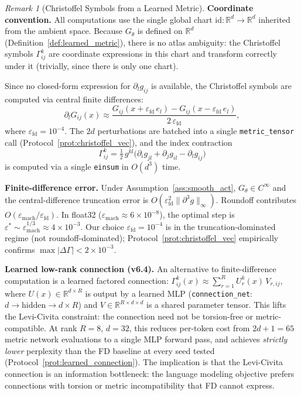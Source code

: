 \documentclass[11pt,a4paper]{article}
\theoremstyle{definition}
\theoremstyle{remark}
\newtheorem{remark}[theorem]{Remark}
\newcommand{\R}{\mathbb{R}}
\begin{document}
\begin{remark}[Christoffel Symbols from a Learned Metric]%
\label{rem:christoffel_learned}
\textbf{Coordinate convention.} All computations use the single 
global chart $\mathrm{id} : \R^d \to \R^d$ inherited from 
the ambient space. Because $G_\theta$ is defined on $\R^d$ 
(Definition~\ref{def:learned_metric}), there is no atlas 
ambiguity: the Christoffel symbols $\Gamma^k_{ij}$ are 
coordinate expressions in this chart and transform correctly 
under it (trivially, since there is only one chart).

Since no closed-form expression for $\partial_l g_{ij}$ is 
available, the Christoffel symbols are computed via central 
finite differences:
\begin{equation}\label{eq:christoffel_fd}
    \partial_l G_{ij}(x) \approx 
    \frac{G_{ij}(x + \varepsilon_{\mathrm{fd}}\, e_l) - 
          G_{ij}(x - \varepsilon_{\mathrm{fd}}\, e_l)}
    {2\,\varepsilon_{\mathrm{fd}}},
\end{equation}
where $\varepsilon_{\mathrm{fd}} = 10^{-4}$. The $2d$ 
perturbations are batched into a single \texttt{metric\_tensor} 
call (Protocol~\ref{prot:christoffel_vec}), and the index 
contraction
\begin{equation}\label{eq:christoffel_einsum}
    \Gamma^k_{ij} = \tfrac{1}{2}\, g^{kl}\!
    \bigl(\partial_i g_{jl} + \partial_j g_{il} 
    - \partial_l g_{ij}\bigr)
\end{equation}
is computed via a single \texttt{einsum} in $O(d^3)$ time.

\textbf{Finite-difference error.}
Under Assumption~\ref{ass:smooth_act}, $G_\theta \in C^\infty$ 
and the central-difference truncation error is 
$O(\varepsilon_{\mathrm{fd}}^2 \|\partial^3 g\|_\infty)$. 
Roundoff contributes $O(\varepsilon_{\mathrm{mach}} / 
\varepsilon_{\mathrm{fd}})$. In float32 
($\varepsilon_{\mathrm{mach}} \approx 6 \times 10^{-8}$), 
the optimal step is 
$\varepsilon^* \sim \varepsilon_{\mathrm{mach}}^{1/3} 
\approx 4 \times 10^{-3}$. Our choice 
$\varepsilon_{\mathrm{fd}} = 10^{-4}$ is in the 
truncation-dominated regime (not roundoff-dominated); 
Protocol~\ref{prot:christoffel_vec} empirically confirms 
$\max|\Delta\Gamma| < 2 \times 10^{-3}$.

\textbf{Learned low-rank connection (v6.4).}
An alternative to finite-difference computation is a learned 
factored connection: $\Gamma^k_{ij}(x) \approx \sum_{r=1}^{R} 
U^k_r(x)\, V_{r,ij}$, where $U(x) \in \R^{d \times R}$ is 
output by a learned MLP (\texttt{connection\_net}: $d \to 
\text{hidden} \to d \times R$) and $V \in \R^{R \times d \times d}$ 
is a shared parameter tensor. This lifts the Levi-Civita constraint: 
the connection need not be torsion-free or metric-compatible. At 
rank $R = 8$, $d = 32$, this reduces per-token cost from $2d+1 = 
65$ metric network evaluations to a single MLP forward pass, and 
achieves \emph{strictly lower} perplexity than the FD baseline at 
every seed tested (Protocol~\ref{prot:learned_connection}). The 
implication is that the Levi-Civita connection is an information 
bottleneck: the language modeling objective prefers connections 
with torsion or metric incompatibility that FD cannot express.
\end{remark}
\end{document}

